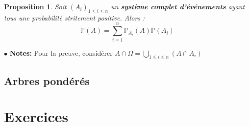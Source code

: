 \documentclass[a4paper]{report}
\theoremstyle{break}
\newtheorem{prop}{Proposition}[chapter]
\newcommand{\p}{\mathbb{P}}
\newcommand{\note}{$\bullet$ \textbf{Notes: }}
\begin{document}
\begin{prop}
  Soit $(A_i)_{1\leq i \leq n}$ un \textbf{système complet
    d'événements} ayant tous une probabilité stritement
  positive. Alors :
  \[
    \p(A) = \sum \limits_{i=1}^n \p_{A_i}(A)\p(A_i)
  \]
\end{prop}

\note Pour la preuve, considérer $A \cap \Omega = \bigcup \limits_{1
  \leq i \leq n} (A \cap A_i)$

\subsection{Arbres pondérés}

\section{Exercices}



\end{document}
